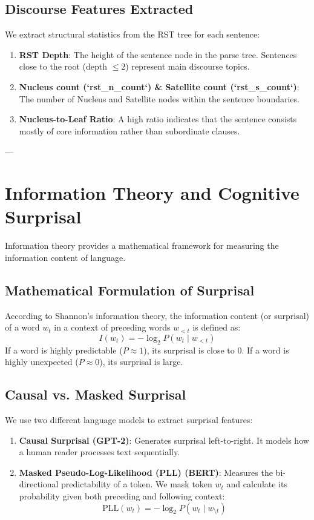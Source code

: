 \documentclass[11pt,a4paper]{article}
\begin{document}
\subsection{Discourse Features Extracted}
We extract structural statistics from the RST tree for each sentence:
\begin{enumerate}
    \item \textbf{RST Depth}: The height of the sentence node in the parse tree. Sentences close to the root (depth $\le 2$) represent main discourse topics.
    \item \textbf{Nucleus count (`rst\_n\_count`) \& Satellite count (`rst\_s\_count`)}: The number of Nucleus and Satellite nodes within the sentence boundaries.
    \item \textbf{Nucleus-to-Leaf Ratio}: A high ratio indicates that the sentence consists mostly of core information rather than subordinate clauses.
\end{enumerate}

---

\section{Information Theory and Cognitive Surprisal}

Information theory provides a mathematical framework for measuring the information content of language.

\subsection{Mathematical Formulation of Surprisal}
According to Shannon’s information theory, the information content (or surprisal) of a word $w_t$ in a context of preceding words $w_{<t}$ is defined as:
\[
I(w_t) = -\log_2 P(w_t \mid w_{<t})
\]
If a word is highly predictable ($P \approx 1$), its surprisal is close to 0. If a word is highly unexpected ($P \approx 0$), its surprisal is large.

\subsection{Causal vs. Masked Surprisal}
We use two different language models to extract surprisal features:
\begin{enumerate}
    \item \textbf{Causal Surprisal (GPT-2)}: Generates surprisal left-to-right. It models how a human reader processes text sequentially.
    \item \textbf{Masked Pseudo-Log-Likelihood (PLL) (BERT)}: Measures the bi-directional predictability of a token. We mask token $w_t$ and calculate its probability given both preceding and following context:
    \[
    \text{PLL}(w_t) = -\log_2 P(w_t \mid w_{\setminus t})
    \]
\end{enumerate}
\end{document}

